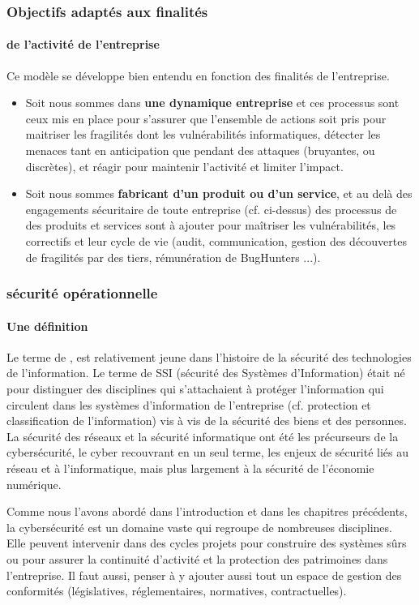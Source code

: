 \begin{frame}
\frametitle<presentation>{Objectifs adaptés aux finalités}
\framesubtitle<presentation>{de l'activité de l'entreprise}
Ce modèle se développe bien entendu en fonction des finalités de l'entreprise.

\begin{itemize}
    \item Soit nous sommes dans \textbf{une dynamique entreprise} et ces processus sont ceux mis en place pour s'assurer que  l'ensemble de actions soit pris pour maitriser les fragilités dont les vulnérabilités informatiques, détecter les menaces tant en anticipation que pendant des attaques (bruyantes, ou discrètes), et réagir pour maintenir l'activité et limiter l'impact.
    \item  Soit nous sommes \textbf{fabricant d'un produit ou d'un service}, et au delà des engagements sécuritaire de toute entreprise (cf. ci-dessus) des processus de  des produits et services sont à ajouter pour maîtriser les vulnérabilités, les correctifs et leur cycle de vie  (audit, communication, gestion des découvertes de fragilités par des tiers, rémunération de BugHunters ...).
\end{itemize}
\end{frame}

\begin{frame}
\frametitle<presentation>{sécurité opérationnelle}
\framesubtitle<presentation>{Une définition}
 Le terme de , est relativement jeune dans l’histoire de la sécurité des technologies de l’information. Le terme de SSI (sécurité des Systèmes d’Information) était né pour distinguer des disciplines qui s’attachaient à protéger l’information qui circulent dans les systèmes d'information de l’entreprise (cf. protection et classification de l’information) vis à vis de la sécurité des biens et des personnes. La sécurité des réseaux et la sécurité informatique ont été les précurseurs de la cybersécurité, le cyber recouvrant en un seul terme, les enjeux de sécurité liés au réseau et à l’informatique, mais plus largement à la sécurité de l'économie numérique.
\end{frame}

Comme nous l’avons abordé dans l'introduction et dans les chapitres précédents, la cybersécurité est un domaine vaste qui regroupe de nombreuses disciplines. Elle peuvent intervenir dans des cycles projets pour construire des systèmes sûrs ou pour assurer la continuité d’activité et la protection des patrimoines dans l'entreprise. Il faut aussi, penser à y ajouter aussi tout un espace de gestion des conformités (législatives, réglementaires, normatives, contractuelles).


